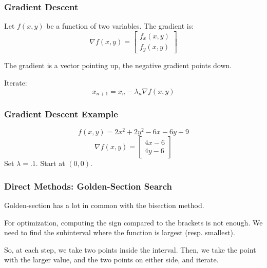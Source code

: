 \documentclass[12pt]{beamer}
\theoremstyle{definition}
\begin{document}
\begin{frame}
\frametitle{Gradient Descent}
Let $f(x,y)$ be a function of two variables. The gradient is:
\[\nabla f(x,y) = \left[ \begin{array}{c} f_x(x,y) \\ f_y(x,y) \end{array} \right]\]

The gradient is a vector pointing up, the negative gradient points down.

Iterate:
\[ x_{n+1} = x_n -\lambda_n \nabla f(x,y)\]
\end{frame}
\begin{frame}
\frametitle{Gradient Descent Example}
\[f(x,y) = 2x^2+2y^2-6x-6y+9\]
\[\nabla f(x,y) = \left[ \begin{array}{c} 4x -6 \\ 4y - 6 \end{array}\right]\]
Set $\lambda = .1$. Start at $(0,0)$.
\end{frame}

\begin{frame}
\frametitle{Direct Methods: Golden-Section Search}

Golden-section has a lot in common with the bisection method.

For optimization, computing the sign compared to the brackets is not enough.
We need to find the subinterval where the function is largest (resp. smallest).

So, at each step, we take two points inside the interval. Then, we take the
point with the larger value, and the two points on either side, and iterate.
\end{frame}
\end{document}
